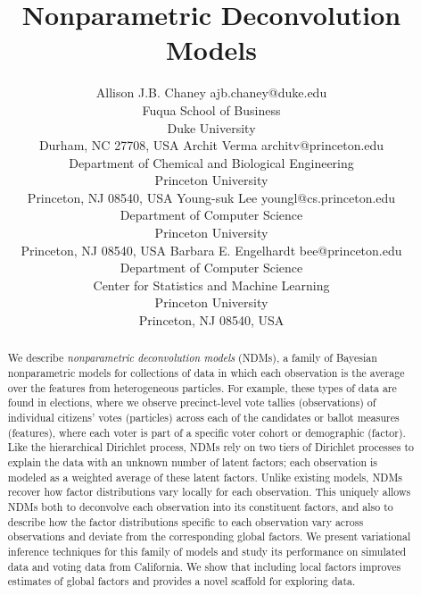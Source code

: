 \documentclass[twoside,11pt]{article}
\begin{document}
\title{Nonparametric Deconvolution Models}

\author{\name Allison J.B. Chaney \email ajb.chaney@duke.edu \\
       \addr Fuqua School of Business\\
       Duke University\\
       Durham, NC 27708, USA
       \AND
       \name Archit Verma \email architv@princeton.edu \\
       \addr Department of Chemical and Biological Engineering\\
       Princeton University\\
       Princeton, NJ 08540, USA
       \AND
       \name Young-suk Lee \email youngl@cs.princeton.edu \\
       \addr Department of Computer Science\\
       Princeton University\\
       Princeton, NJ 08540, USA
       \AND
       \name Barbara E. Engelhardt \email bee@princeton.edu \\
       \addr Department of Computer Science\\
       \addr Center for Statistics and Machine Learning\\
       Princeton University\\
       Princeton, NJ 08540, USA}


\maketitle

\begin{abstract}%
We describe \emph{nonparametric deconvolution models} (NDMs),
a family of Bayesian nonparametric models for collections of data in which each observation is the average over the features from heterogeneous particles. For example, these types of data are found in elections, where we observe precinct-level vote tallies (observations) of individual citizens' votes (particles) across each of the candidates or ballot measures (features), where each voter is part of a specific voter cohort or demographic (factor).  Like the hierarchical Dirichlet process, NDMs rely on two tiers of Dirichlet processes to explain the data with an unknown number of latent factors; each observation is modeled as a weighted average of these latent factors.  Unlike existing models, NDMs recover how factor distributions vary locally for each observation.
This uniquely allows NDMs both to deconvolve each observation into its constituent factors, and also to describe how the factor distributions specific to each observation vary across observations and deviate from the corresponding global factors.
We present variational inference techniques for this family of models and study its performance on simulated data and voting data from California.
We show that including local factors improves estimates of global factors and provides a novel scaffold for exploring data.
\end{abstract}
\end{document}
